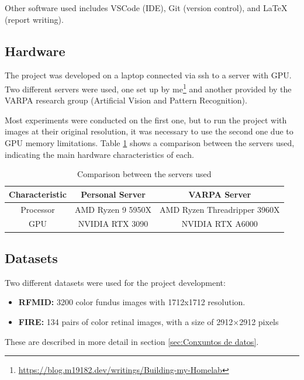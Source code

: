 Other software used includes VSCode (IDE), Git (version control), and LaTeX (report writing).

\subsection{Hardware}
\label{subsec:Hardware}

The project was developed on a laptop connected via ssh to a server with GPU. 
Two different servers were used, one set up by me\footnote{\url{https://blog.m19182.dev/writings/Building-my-Homelab}} and another provided by the VARPA research group (Artificial Vision and Pattern Recognition).

Most experiments were conducted on the first one, but to run the project with images at their original resolution, it was necessary to use the second one
due to GPU memory limitations. Table \ref{tab:comparativa_servidores} shows a comparison between the servers used, indicating the main hardware characteristics of each.

\begin{table}[tbp]
\centering
\begin{tabular}{|c|c|c|}
\hline
\textbf{Characteristic} & \textbf{Personal Server} & \textbf{VARPA Server} \\ \hline
Processor & AMD Ryzen 9 5950X&  AMD Ryzen Threadripper 3960X \\ \hline
GPU & NVIDIA RTX 3090 & NVIDIA RTX A6000  \\ \hline
\end{tabular}
\caption{Comparison between the servers used}
\label{tab:comparativa_servidores}
\end{table}


\subsection{Datasets}
\label{subsec:Conxuntos de datos}
Two different datasets were used for the project development:

\begin{itemize}
    \item \textbf{RFMID:} 3200 color fundus images with 1712x1712 resolution.
    \item \textbf{FIRE:} 134 pairs of color retinal images, with a size of 2912×2912 pixels
\end{itemize}

These are described in more detail in section \ref{sec:Conxuntos de datos}.

